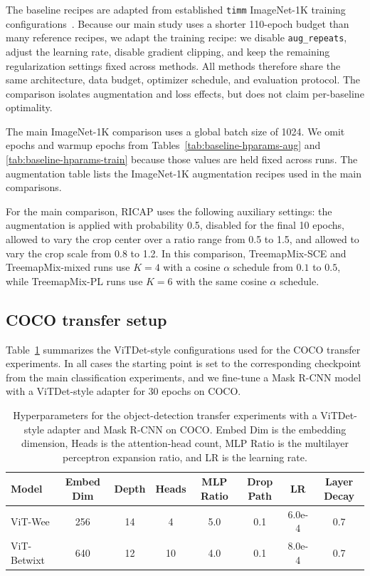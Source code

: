 The baseline recipes are adapted from established \texttt{timm} ImageNet-1K
training configurations~\citep{rw2019timm,262588213843476SearchingBetterVit}.
Because our main study uses a shorter 110-epoch budget than many reference
recipes, we adapt the training recipe: we disable
\texttt{aug\_repeats}, adjust the learning rate, disable gradient clipping, and keep the remaining regularization settings fixed across methods.
All methods therefore share the same architecture, data budget, optimizer schedule, and evaluation protocol. The comparison isolates augmentation and loss effects, but does not claim per-baseline optimality.

The main ImageNet-1K comparison uses a global batch size of 1024. We omit epochs and warmup epochs
from Tables~\ref{tab:baseline-hparams-aug} and
\ref{tab:baseline-hparams-train} because those values are held fixed across
runs. The augmentation table lists the ImageNet-1K augmentation recipes used
in the main comparisons.

For the main comparison, RICAP uses the following auxiliary settings: the augmentation is
applied with probability 0.5, disabled for the final 10 epochs, allowed to
vary the crop center over a ratio range from 0.5 to 1.5, and allowed to vary
the crop scale from 0.8 to 1.2. In this comparison, TreemapMix-SCE and
TreemapMix-mixed runs use $K=4$ with a cosine $\alpha$ schedule from $0.1$
to $0.5$, while TreemapMix-PL runs use $K=6$ with the same cosine
$\alpha$ schedule.







\subsection{COCO transfer setup}
\label{app:det-hparams}

Table~\ref{tab:det-hparams} summarizes the ViTDet-style configurations used
for the COCO transfer experiments. In all cases the starting point
is set to the corresponding checkpoint from the main classification
experiments, and we fine-tune a Mask R-CNN model with a ViTDet-style adapter
for 30 epochs on COCO.

\begin{table}[!htbp]
  \centering
  \small
  \caption{Hyperparameters for the object-detection transfer experiments with
  a ViTDet-style adapter and Mask R-CNN on COCO. Embed Dim is the embedding
  dimension, Heads is the attention-head count, MLP Ratio is the multilayer
  perceptron expansion ratio, and LR is the learning rate.}
  \label{tab:det-hparams}
  \begin{tabular}{lccccccc}
    \toprule
    Model & Embed Dim & Depth & Heads & MLP Ratio & Drop Path & LR & Layer Decay \\
    \midrule
    ViT-Wee & 256 & 14 & 4 & 5.0 & 0.1 & 6.0e-4 & 0.7 \\
    ViT-Betwixt & 640 & 12 & 10 & 4.0 & 0.1 & 8.0e-4 & 0.7 \\
    \bottomrule
  \end{tabular}%
\end{table}

